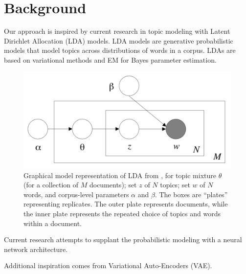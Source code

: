 \documentclass[twoside,twocolumn]{article}
\begin{document}

\section{Background}

Our approach is inspired by current research in topic modeling with Latent
Dirichlet Allocation (LDA) models. LDA models are generative probabilistic
models that model topics across distributions of words in a corpus. LDAs are
based on variational methods and EM for Bayes parameter estimation.

\cite{blei2003latent}
\cite{kingma2013auto}

\begin{figure}
\centering
\includegraphics[scale=0.5]{LDADiagram}
\caption{Graphical model representation of LDA from \cite{blei2003latent}, for
topic mixture $\theta$ (for a collection of $M$ documents); set $z$ of $N$
topics; set $w$ of $N$ words, and corpus-level parameters $\alpha$ and $\beta$.
The boxes are ``plates'' representing replicates. The outer plate represents
documents, while the inner plate represents the repeated choice of topics and
words within a document.}
\end{figure}

Current research attempts to supplant the probabilistic modeling with a neural
network architecture.

Additional inspiration comes from Variational Auto-Encoders (VAE).

\end{document}
